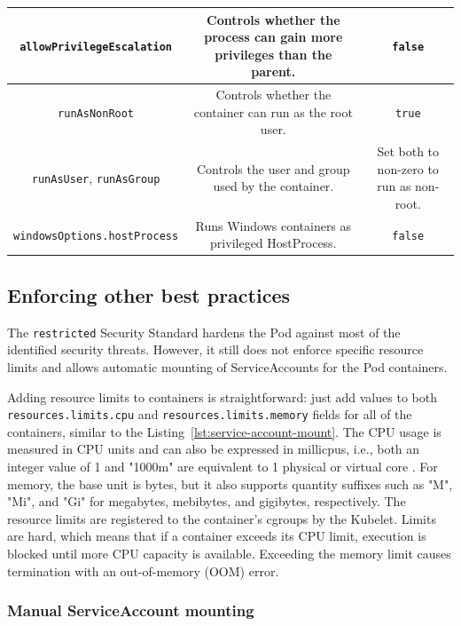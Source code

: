 \documentclass[english, 12pt, a4paper, sci, utf8, a-2b, online]{aaltothesis}
\begin{document}
\begin{table}[H]
\begin{minipage}{\textwidth}
\begin{tabularx}{\textwidth}{CCC}
    \lstinline{allowPrivilegeEscalation} & Controls whether the process can gain more privileges than the parent. & \lstinline{false} \\ \hline
    \lstinline{runAsNonRoot} & Controls whether the container can run as the root user. & \lstinline{true} \\ \hline
    \lstinline{runAsUser}, \lstinline{runAsGroup} & Controls the user and group used by the container. & Set both to non-zero to run as non-root. \\ \hline
    \lstinline{windowsOptions.hostProcess} & Runs Windows containers as privileged HostProcess. & \lstinline{false} \\ \hline
  \end{tabularx}
  \end{minipage}
\end{table}

\subsection{Enforcing other best practices}

The \lstinline{restricted} Security Standard hardens the Pod against most of the identified security threats.
However, it still does not enforce specific resource limits and allows automatic mounting of ServiceAccounts for the Pod containers.

Adding resource limits to containers is straightforward: just add values to both \lstinline{resources.limits.cpu} and \lstinline{resources.limits.memory} fields for all of the containers, similar to the Listing~\ref{lst:service-account-mount}.
The CPU usage is measured in CPU units and can also be expressed in millicpus, i.e., both an integer value of 1 and "1000m" are equivalent to 1 physical or virtual core \cite{k8s-docs-resources}.
For memory, the base unit is bytes, but it also supports quantity suffixes such as "M", "Mi", and "Gi" for megabytes, mebibytes, and gigibytes, respectively.
The resource limits are registered to the container's cgroups by the Kubelet.
Limits are hard, which means that if a container exceeds its CPU limit, execution is blocked until more CPU capacity is available.
Exceeding the memory limit causes termination with an out-of-memory (OOM) error.

\subsubsection{Manual ServiceAccount mounting}
\end{document}
